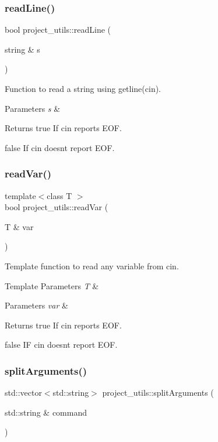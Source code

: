 \subsubsection{\texorpdfstring{read\+Line()}{readLine()}}
{\footnotesize\ttfamily bool project\+\_\+utils\+::read\+Line (\begin{DoxyParamCaption}\item[{string \&}]{s }\end{DoxyParamCaption})}



Function to read a string using getline(cin). 


\begin{DoxyParams}{Parameters}
{\em s} & \\
\hline
\end{DoxyParams}
\begin{DoxyReturn}{Returns}
true If cin reports E\+OF. 

false If cin doesn\textquotesingle{}t report E\+OF. 
\end{DoxyReturn}
\mbox{\label{namespaceproject__utils_a72293f22700ff24cdf6663f45ca10c91}} 
\subsubsection{\texorpdfstring{read\+Var()}{readVar()}}
{\footnotesize\ttfamily template$<$class T $>$ \\
bool project\+\_\+utils\+::read\+Var (\begin{DoxyParamCaption}\item[{T \&}]{var }\end{DoxyParamCaption})}



Template function to read any variable from cin. 


\begin{DoxyTemplParams}{Template Parameters}
{\em T} & \\
\hline
\end{DoxyTemplParams}

\begin{DoxyParams}{Parameters}
{\em var} & \\
\hline
\end{DoxyParams}
\begin{DoxyReturn}{Returns}
true If cin reports E\+OF. 

false IF cin doesn\textquotesingle{}t report E\+OF. 
\end{DoxyReturn}
\mbox{\label{namespaceproject__utils_a8a3acf9a2b81c44b525870adb954dcff}} 
\subsubsection{\texorpdfstring{split\+Arguments()}{splitArguments()}}
{\footnotesize\ttfamily std\+::vector$<$std\+::string$>$ project\+\_\+utils\+::split\+Arguments (\begin{DoxyParamCaption}\item[{std\+::string \&}]{command }\end{DoxyParamCaption})}

